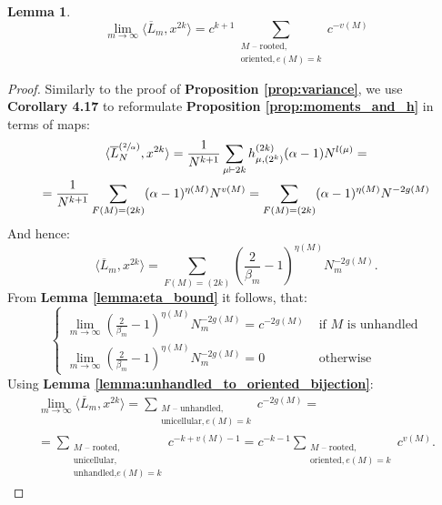 \documentclass{article}
\newtheorem{lemma}{Lemma}
\begin{document}
\begin{lemma}\label{lemma:moments_as_polynomial_in_c}
\begin{equation}
    \lim\limits_{m \to \infty}\langle \overline{L}_m, x^{2k} \rangle = c^{k + 1}\sum\limits_{\substack{\text{$M$ -- rooted, } \\ \text{oriented}, e(M) = k}}c^{-v(M)}
\end{equation}
\end{lemma}
\begin{proof}
    Similarly to the proof of \textbf{Proposition \ref{prop:variance}}, we use \cite{lacroix} \textbf{Corollary 4.17} to reformulate \textbf{Proposition \ref{prop:moments_and_h}} in terms of maps:
    \begin{multline}        
        \langle \overline{L}_{N}^{(\sfrac{2}{\alpha})}, x^{2k} \rangle = \frac{1}{N^{k + 1}}\sum\limits_{\mu \vdash 2k}h_{\mu, (2^k)}^{(2k)}(\alpha - 1)N^{l(\mu)} = \\
        = \frac{1}{N^{k + 1}}\sum\limits_{\substack{F(M) = (2k)}}(\alpha - 1)^{\eta(M)}N^{v(M)} = \sum\limits_{\substack{F(M) = (2k)}}(\alpha - 1)^{\eta(M)}N^{-2g(M)}
    \end{multline}
    And hence:
    $$ 
        \langle \overline{L}_m, x^{2k} \rangle = \sum\limits_{F(M) = (2k)}\left(\frac{2}{\beta_m} - 1\right)^{\eta(M)}N_m^{-2g(M)}.
    $$
    From \textbf{Lemma \ref{lemma:eta_bound}} it follows, that:
    $$
    \begin{cases}
        \lim\limits_{m \to \infty}\left(\frac{2}{\beta_m} - 1\right)^{\eta(M)}N_m^{-2g(M)} = c^{-2g(M)} & \text{ if $M$ is unhandled} \\
        \lim\limits_{m \to \infty}\left(\frac{2}{\beta_m} - 1\right)^{\eta(M)}N_m^{-2g(M)} = 0 & \text{ otherwise }
    \end{cases}
    $$
    Using \textbf{Lemma \ref{lemma:unhandled_to_oriented_bijection}}:
    \begin{multline*}
        \lim\limits_{m \to \infty}\langle \overline{L}_m, x^{2k} \rangle = \sum\limits_{ \substack{ M  \text{ -- unhandled}, \\ \text{unicellular}, e(M) = k}}c^{-2g(M)} = \\ = \sum\limits_{\substack{\text{$M$ -- rooted, } \\ \text{unicellular,} \\ \text{unhandled,} e(M) = k}}c^{-k + v(M) - 1} = c^{-k - 1}\sum\limits_{\substack{\text{$M$ -- rooted, } \\ \text{oriented}, e(M) = k}}c^{v(M)}.
    \end{multline*}
\end{proof}
\end{document}
